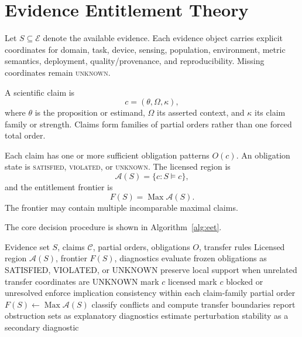 \documentclass[journal]{IEEEtran}
\newcommand{\Acal}{\mathcal{A}}
\begin{document}
\section{Evidence Entitlement Theory}
Let $S\subseteq\mathcal{E}$ denote the available evidence. Each evidence object carries explicit coordinates for domain, task, device, sensing, population, environment, metric semantics, deployment, quality/provenance, and reproducibility. Missing coordinates remain \textsc{unknown}.

A scientific claim is
\begin{equation}c=(\theta,\Omega,\kappa),\label{eq:claim}\end{equation}
where $\theta$ is the proposition or estimand, $\Omega$ its asserted context, and $\kappa$ its claim family or strength. Claims form families of partial orders rather than one forced total order.

Each claim has one or more sufficient obligation patterns $O(c)$. An obligation state is \textsc{satisfied}, \textsc{violated}, or \textsc{unknown}. The licensed region is
\begin{equation}\Acal(S)=\{c:S\models c\},\label{eq:licensed}\end{equation}
and the entitlement frontier is
\begin{equation}F(S)=\operatorname{Max}\Acal(S).\label{eq:frontier}\end{equation}
The frontier may contain multiple incomparable maximal claims.

The core decision procedure is shown in Algorithm~\ref{alg:eet}.
\begin{algorithm}[H]
\caption{EET V2 claim-entitlement procedure}\label{alg:eet}
\begin{algorithmic}[1]
\Require Evidence set $S$, claims $\mathcal C$, partial orders, obligations $O$, transfer rules
\Ensure Licensed region $\Acal(S)$, frontier $F(S)$, diagnostics
\State evaluate frozen obligations as SATISFIED, VIOLATED, or UNKNOWN
\State preserve local support when unrelated transfer coordinates are UNKNOWN
\State mark $c$ licensed
\Else
\State mark $c$ blocked or unresolved
\EndIf
\EndFor
\State enforce implication consistency within each claim-family partial order
\State $F(S)\gets\operatorname{Max}\Acal(S)$
\State classify conflicts and compute transfer boundaries
\State report obstruction sets as explanatory diagnostics
\State estimate perturbation stability as a secondary diagnostic
\end{algorithmic}
\end{algorithm}
\end{document}
